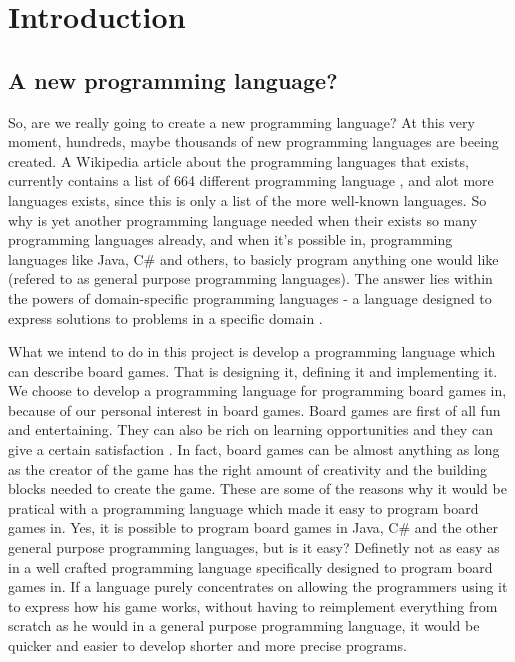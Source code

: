 \chapter{Introduction}
\label{chap:introduction}

\section{A new programming language?}
So, are we really going to create a new programming language? At this very moment, hundreds, maybe thousands of new programming languages are beeing created. A Wikipedia article about the programming languages that exists, currently contains a list of 664 different programming language \cite{listofprogramminglanguages}, and alot more languages exists, since this is only a list of the more well-known languages. So why is yet another programming language needed when their exists so many programming languages already, and when it's possible in, programming languages like Java, C\# and others, to basicly program anything one would like (refered to as general purpose programming languages). The answer lies within the powers of domain-specific programming languages - a language designed to express solutions to problems in a specific domain \cite{domainspecificprogramminglanguagedefinition}. 

What we intend to do in this project is develop a programming language which can describe board games. That is designing it, defining it and implementing it. We choose to develop a programming language for programming board games in, because of our personal interest in board games. Board games are first of all fun and entertaining. They can also be rich on learning opportunities \cite{whyboardgames1?} and they can give a certain satisfaction \cite{whyboardgames2?}. In fact, board games can be almost anything as long as the creator of the game has the right amount of creativity and the building blocks needed to create the game. These are some of the reasons why it would be pratical with a programming language which made it easy to program board games in. Yes, it is possible to program board games in Java, C\# and the other general purpose programming languages, but is it easy? Definetly not as easy as in a well crafted programming language specifically designed to program board games in. If a language purely concentrates on allowing the programmers using it to express how his game works, without having to reimplement everything from scratch as he would in a general purpose programming language, it would be quicker and easier to develop shorter and more precise programs.  

